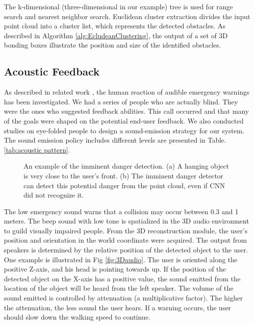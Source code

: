 \documentclass{ieeeaccess}
\begin{document}
The k-dimensional (three-dimensional in our example) tree is used for range search and nearest neighbor search. Euclidean cluster extraction divides the input point cloud into a cluster list, which represents the detected obstacles. As described in Algorithm \ref{alg:EcludeanClustering}, the output of a set of 3D bonding boxes illustrate the position and size of the identified obstacles.




\subsection{Acoustic Feedback}
As described in related work \cite{kayukawa2019bbeep} \cite{edworthy1991improving}, the human reaction of audible emergency warnings has been investigated. We had a series of people who are actually blind. They were the ones who suggested feedback abilities. This call occurred and that many of the goals were shaped on the potential end-user feedback. We also conducted studies on eye-folded people to design a sound-emission strategy for our system. The sound emission policy includes different levels are presented in Table. \ref{tab:acoustic pattern}.

\begin{figure}
    \centering
    \caption{An example of the imminent danger detection. (a) A hanging object is very close to the user's front. (b) The imminent danger detector can detect this potential danger from the point cloud, even if CNN did not recognize it.}%
    \label{fig:urgent_danger_detection}
\end{figure}




The low emergency sound warns that a collision may occur between 0.3 and 1 meters. The beep sound with low tone is spatialized in the 3D audio environment to guild visually impaired people. From the 3D reconstruction module, the user's position and orientation in the world coordinate were acquired. The output from speakers is determined by the relative position of the detected object to the user. One example is illustrated in Fig \ref{fig:3Daudio}. The user is oriented along the positive Z-axis, and his head is pointing towards up. If the position of the detected object on the X-axis has a positive value, the sound emitted from the location of the object will be heard from the left speaker. The volume of the sound emitted is controlled by attenuation (a multiplicative factor). The higher the attenuation, the less sound the user hears. If a warning occurs, the user should slow down the walking speed to continue.
\end{document}
